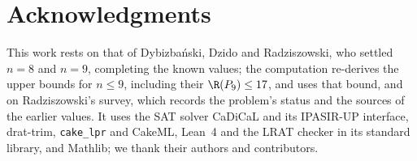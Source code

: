 \section*{Acknowledgments}
This work rests on that of Dybizbański, Dzido and Radziszowski, who
settled $n=8$ and $n=9$, completing the known values; the computation
re-derives the upper bounds for $n\le9$, including their
$\R(P_9)\le17$, and uses that bound, and on Radziszowski's survey, which records the problem's status and
the sources of the earlier values. It uses the SAT solver CaDiCaL and its
IPASIR-UP interface, drat-trim, \texttt{cake\_lpr} and CakeML, Lean~4 and
the LRAT checker in its standard library, and Mathlib; we thank their
authors and contributors.

